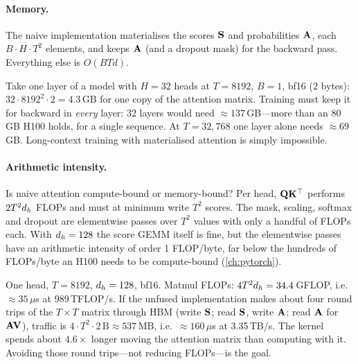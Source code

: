 \paragraph{Memory.} The naive implementation materialises the scores $\mathbf{S}$ and probabilities
$\mathbf{A}$, each $B\cdot H\cdot T^2$ elements, and keeps $\mathbf{A}$ (and a dropout mask) for the backward
pass. Everything else is $O(BTd)$.

\begin{napkinmath}
Take one layer of a model with $H=32$ heads at $T=8192$, $B=1$, bf16 (2 bytes):
$32\cdot 8192^2\cdot 2 = 4.3$\,GB for one copy of the attention matrix. Training must keep it for
backward in \emph{every} layer: 32 layers would need $\approx 137$\,GB---more than an 80\,GB H100
holds, for a single sequence. At $T=32{,}768$ one layer alone needs $\approx 69$\,GB.
Long-context training with materialised attention is simply impossible.
\end{napkinmath}

\paragraph{Arithmetic intensity.} Is naive attention compute-bound or memory-bound? Per head,
$\mathbf{Q}\mathbf{K}^\top$ performs $2T^2d_{h}$ FLOPs and must at minimum write $T^2$ scores. The
mask, scaling, softmax and dropout are elementwise passes over $T^2$ values with only a handful of
FLOPs each. With $d_{h}=128$ the score GEMM itself is fine, but the elementwise passes have an
arithmetic intensity of order 1 FLOP/byte, far below the hundreds of FLOPs/byte an H100 needs to be
compute-bound (\cref{ch:pytorch}).

\begin{napkinmath}
One head, $T=8192$, $d_{h}=128$, bf16. Matmul FLOPs: $4T^2d_{h} = 34.4$\,GFLOP, i.e.\
$\approx 35\,\mu$s at 989\,TFLOP/s. If the unfused implementation makes about four round trips of
the $T\times T$ matrix through HBM (write $\mathbf{S}$; read $\mathbf{S}$, write $\mathbf{A}$; read $\mathbf{A}$
for $\mathbf{A}\mathbf{V}$), traffic is $4\cdot T^2\cdot 2\,\text{B}\approx 537$\,MB, i.e.\
$\approx 160\,\mu$s at 3.35\,TB/s. The kernel spends about $4.6\times$ longer moving the attention
matrix than computing with it. Avoiding those round trips---not reducing FLOPs---is the goal.
\end{napkinmath}

